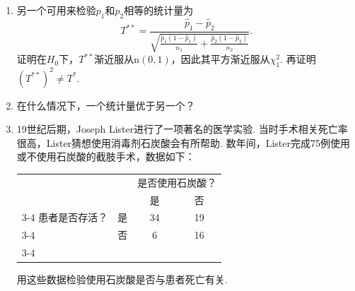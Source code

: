 \begin{exercise}
\begin{enumerate}[label=(\alph*)]
$$\begin{aligned}
&=\frac{\left(S_1-\frac{n_1S}{n_1+n_2}\right)^2}{\frac{n_1S}{n_1+n_2}}+\cdots+\frac{\left(F_2-\frac{n_2F}{n_1+n_2}\right)^2}{\frac{n_2F}{n_1+n_2}}.
\end{aligned}$$
用代数方法证明$T^*=T$，从而$T^*$渐近服从卡方分布.
\item 另一个可用来检验$p_1$和$p_2$相等的统计量为
$$T^{**}=\frac{\hat p_1-\hat p_2}{\sqrt{\frac{\hat p_1(1-\hat p_1)}{n_1}+\frac{\hat p_2(1-\hat p_2)}{n_2}}}.$$
证明在$H_0$下，$T^{**}$渐近服从$\mathrm n(0,1)$，因此其平方渐近服从$\chi_1^2$. 再证明$(T^{**})^2\ne T^*$.
\item 在什么情况下，一个统计量优于另一个？
\item 19世纪后期，Joseph Lister进行了一项著名的医学实验. 当时手术相关死亡率很高，Lister猜想使用消毒剂石炭酸会有所帮助. 数年间，Lister完成75例使用或不使用石炭酸的截肢手术，数据如下：
\begin{center}
\begin{tabular}{llcc}
&&\multicolumn{2}{c}{是否使用石炭酸？}\\
&&是&否\\\cline{3-4}
患者是否存活？&是&\multicolumn{1}{|c|}{34}&\multicolumn{1}{c|}{19}\\\cline{3-4}
&否&\multicolumn{1}{|c|}{6}&\multicolumn{1}{c|}{16}\\\cline{3-4}
\end{tabular}
\end{center}
用这些数据检验使用石炭酸是否与患者死亡有关.
\end{enumerate}
\end{exercise}


